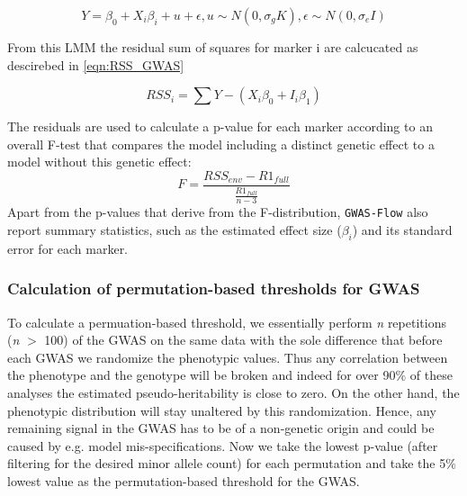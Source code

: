 \begin{equation}
Y = \beta_{0} + X_i\beta_i + u + \epsilon, u \sim N(0,\sigma_gK), \epsilon \sim N(0,\sigma_e I )
\label{eqn:LMM GWAS}
\end{equation}

From  this LMM the residual sum of squares for marker i are calcucated as descirebed in \ref{eqn:RSS_GWAS}


\begin{equation}
RSS_{i} =  \sum{Y - (X_{i}\beta_{0}   + I_{i}\beta_{1})}
\label{eqn:RSS_GWAS}
\end{equation}




\noindent
The residuals are used to calculate a p-value for each marker according to an overall F-test that compares the model including a distinct genetic effect to a model without this genetic effect: 
\begin{equation}
  F = \frac{RSS_{env} - R1_{full} }{\frac{R1_{full}}{n-3}}
  \label{F_test}
  \end{equation}
\noindent
Apart from the p-values that derive from the F-distribution, \texttt{GWAS-Flow} also report summary statistics, such as the estimated effect size ($\beta_i$) and its standard error for each marker.
\subsubsection{Calculation of permutation-based thresholds for GWAS}

To calculate a permuation-based threshold, we essentially perform \textit{n} repetitions (\textit{n} $>$ 100) of the GWAS on the same data with the sole difference that before each GWAS we randomize the phenotypic values. Thus any correlation between the phenotype and the genotype will be broken and indeed for over 90\% of these analyses the estimated pseudo-heritability is close to zero. On the other hand, the phenotypic distribution will stay unaltered by this randomization. Hence, any remaining signal in the GWAS has to be of a non-genetic origin and could be caused by e.g. model mis-specifications. Now we take the lowest p-value (after filtering for the desired minor allele count) for each permutation and take the 5\% lowest value as the permutation-based threshold for the GWAS.

